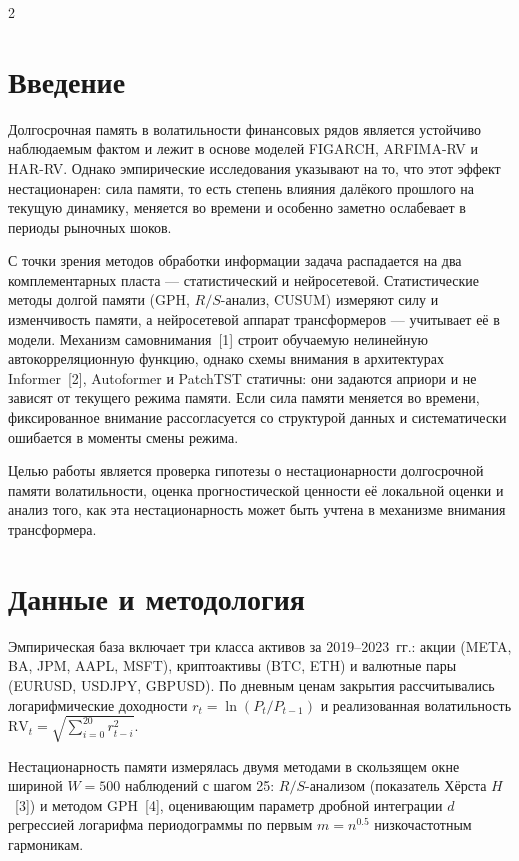 \documentclass[a4paper,10pt,twoside]{article}
\begin{document}
\begin{multicols}{2}

\section*{Введение}

Долгосрочная память в волатильности финансовых рядов является устойчиво наблюдаемым фактом и лежит в основе моделей FIGARCH, ARFIMA-RV и HAR-RV. Однако эмпирические исследования указывают на то, что этот эффект нестационарен: сила памяти, то есть степень влияния далёкого прошлого на текущую динамику, меняется во времени и особенно заметно ослабевает в периоды рыночных шоков.

С точки зрения методов обработки информации задача распадается на два комплементарных пласта --- статистический и нейросетевой. Статистические методы долгой памяти (GPH, $R/S$-анализ, CUSUM) измеряют силу и изменчивость памяти, а нейросетевой аппарат трансформеров --- учитывает её в модели. Механизм самовнимания~[1] строит обучаемую нелинейную автокорреляционную функцию, однако схемы внимания в архитектурах Informer~[2], Autoformer и PatchTST статичны: они задаются априори и не зависят от текущего режима памяти. Если сила памяти меняется во времени, фиксированное внимание рассогласуется со структурой данных и систематически ошибается в моменты смены режима.

Целью работы является проверка гипотезы о нестационарности долгосрочной памяти волатильности, оценка прогностической ценности её локальной оценки и анализ того, как эта нестационарность может быть учтена в механизме внимания трансформера.

\section{Данные и методология}

Эмпирическая база включает три класса активов за 2019--2023~гг.: акции (META, BA, JPM, AAPL, MSFT), криптоактивы (BTC, ETH) и валютные пары (EURUSD, USDJPY, GBPUSD). По дневным ценам закрытия рассчитывались логарифмические доходности $r_t=\ln(P_t/P_{t-1})$ и реализованная волатильность $\mathrm{RV}_t=\sqrt{\sum_{i=0}^{20} r_{t-i}^2}$.

Нестационарность памяти измерялась двумя методами в скользящем окне шириной $W=500$ наблюдений с шагом 25: $R/S$-анализом (показатель Хёрста $H$~[3]) и методом GPH~[4], оценивающим параметр дробной интеграции $d$ регрессией логарифма периодограммы по первым $m=n^{0.5}$ низкочастотным гармоникам.


\end{multicols}
\end{document}
